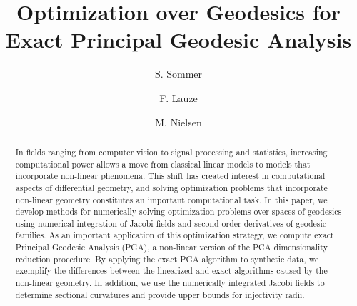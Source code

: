\documentclass[final]{svjour3}
\begin{document}
\title{Optimization over Geodesics for Exact Principal Geodesic Analysis
}

\author{S. Sommer
\and
F. Lauze
\and
M. Nielsen
}


\maketitle

\begin{abstract}
In fields ranging from computer vision to signal processing and statistics, increasing computational power allows a move from classical linear models to models that incorporate non-linear phenomena. This shift has created interest in computational aspects of differential geometry, and solving optimization problems that incorporate non-linear geometry constitutes an important computational task. In this paper, we develop methods for numerically solving optimization problems over spaces of geodesics using numerical integration of Jacobi fields and second order derivatives of geodesic families. As an important application of this optimization strategy, we compute exact Principal Geodesic Analysis (PGA), a non-linear version of the PCA dimensionality reduction procedure. By applying the exact PGA algorithm to synthetic data, we exemplify the differences between the linearized and exact algorithms caused by the non-linear geometry. In addition, we use the numerically integrated Jacobi fields to determine sectional curvatures and provide upper bounds for injectivity radii. 

\end{abstract}
\end{document}

